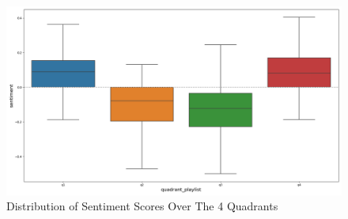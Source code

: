 \documentclass[11pt]{article}
\begin{document}
\begin{figure}[!ht]
  \includegraphics[scale=0.42]{../statics/plots/quadrant_playlist.png}
  \centering
  \caption{Distribution of Sentiment Scores Over The 4 Quadrants}
  \label{fig:quad_playlist}
\end{figure}

\clearpage
{}


\end{document}
